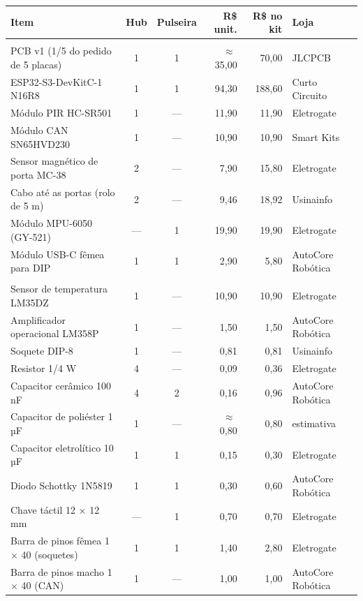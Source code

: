 \begin{tabularx}{\linewidth}{@{}>{\raggedright\arraybackslash}X c c r r l@{}}
\toprule
Item & Hub & Pulseira & R\$ unit. & R\$ no kit & Loja \\
\midrule
\multicolumn{6}{@{}l}{\textit{Placa e módulos}} \\
PCB v1 (1/5 do pedido de 5 placas) & 1 & 1 & $\approx$\,35,00 & 70,00 & JLCPCB \\
ESP32-S3-DevKitC-1 N16R8 & 1 & 1 & 94,30 & 188,60 & Curto Circuito \\
Módulo PIR HC-SR501 & 1 & --- & 11,90 & 11,90 & Eletrogate \\
Módulo CAN SN65HVD230 & 1 & --- & 10,90 & 10,90 & Smart Kits \\
Sensor magnético de porta MC-38 & 2 & --- & 7,90 & 15,80 & Eletrogate \\
Cabo até as portas (rolo de 5 m) & 2 & --- & 9,46 & 18,92 & Usinainfo \\
Módulo MPU-6050 (GY-521) & --- & 1 & 19,90 & 19,90 & Eletrogate \\
Módulo USB-C fêmea para DIP & 1 & 1 & 2,90 & 5,80 & AutoCore Robótica \\
\multicolumn{6}{@{}l}{\textit{Componentes}} \\
Sensor de temperatura LM35DZ & 1 & --- & 10,90 & 10,90 & Eletrogate \\
Amplificador operacional LM358P & 1 & --- & 1,50 & 1,50 & AutoCore Robótica \\
Soquete DIP-8 & 1 & --- & 0,81 & 0,81 & Usinainfo \\
Resistor 1/4 W & 4 & --- & 0,09 & 0,36 & Eletrogate \\
Capacitor cerâmico 100 nF & 4 & 2 & 0,16 & 0,96 & AutoCore Robótica \\
Capacitor de poliéster 1 µF & 1 & --- & $\approx$\,0,80 & 0,80 & estimativa \\
Capacitor eletrolítico 10 µF & 1 & 1 & 0,15 & 0,30 & Eletrogate \\
Diodo Schottky 1N5819 & 1 & 1 & 0,30 & 0,60 & AutoCore Robótica \\
Chave táctil 12 × 12 mm & --- & 1 & 0,70 & 0,70 & Eletrogate \\
Barra de pinos fêmea 1 × 40 (soquetes) & 1 & 1 & 1,40 & 2,80 & Eletrogate \\
Barra de pinos macho 1 × 40 (CAN) & 1 & --- & 1,00 & 1,00 & AutoCore Robótica \\

\end{tabularx}

